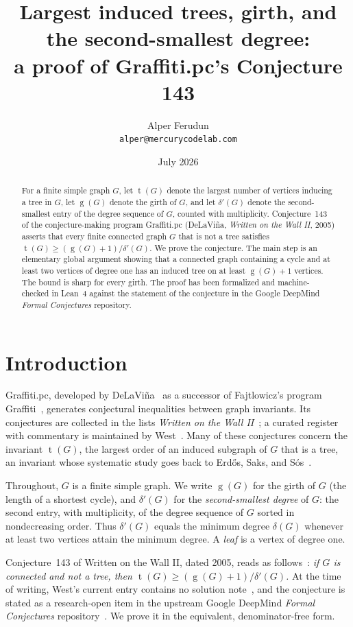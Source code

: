 \documentclass[11pt]{article}
\title{Largest induced trees, girth, and the second-smallest degree:\\
a proof of Graffiti.pc's Conjecture 143}
\author{Alper Ferudun\\\texttt{alper@mercurycodelab.com}}
\date{July 2026}
\numberwithin{equation}{section}
\theoremstyle{remark}
\newcommand{\tr}{\operatorname{t}}
\newcommand{\gr}{\operatorname{g}}
\newcommand{\dd}{\delta'}
\begin{document}
\maketitle

\begin{abstract}
For a finite simple graph $G$, let $\tr(G)$ denote the largest number of
vertices inducing a tree in $G$, let $\gr(G)$ denote the girth of $G$, and let
$\dd(G)$ denote the second-smallest entry of the degree sequence of $G$,
counted with multiplicity.  Conjecture~143 of the conjecture-making program
Graffiti.pc (DeLaVi\~na, \emph{Written on the Wall II}, 2005) asserts that
every finite connected graph $G$ that is not a tree satisfies
$\tr(G)\ge(\gr(G)+1)/\dd(G)$.  We prove the conjecture.  The main step is an
elementary global argument showing that a connected graph containing a cycle
and at least two vertices of degree one has an induced tree on at least
$\gr(G)+1$ vertices.  The bound is sharp for every girth.  The proof has been
formalized and machine-checked in Lean~4 against the statement of the
conjecture in the Google DeepMind \emph{Formal Conjectures} repository.
\end{abstract}

\section{Introduction}

Graffiti.pc, developed by DeLaVi\~na~\cite{DeL01,DeLhistory} as a successor of
Fajtlowicz's program Graffiti~\cite{Faj88}, generates conjectural inequalities
between graph invariants.  Its conjectures are collected in the lists
\emph{Written on the Wall II}~\cite{WOWII}; a curated register with commentary
is maintained by West~\cite{WestReg}.  Many of these conjectures concern the
invariant $\tr(G)$, the largest order of an induced subgraph of $G$ that is a
tree, an invariant whose systematic study goes back to Erd\H{o}s, Saks, and
S\'os~\cite{ESS86}.

Throughout, $G$ is a finite simple graph.  We write $\gr(G)$ for the girth of
$G$ (the length of a shortest cycle), and $\dd(G)$ for the \emph{second-smallest
degree} of $G$: the second entry, with multiplicity, of the degree sequence of
$G$ sorted in nondecreasing order.  Thus $\dd(G)$ equals the minimum degree
$\delta(G)$ whenever at least two vertices attain the minimum degree.  A
\emph{leaf} is a vertex of degree one.

Conjecture~143 of Written on the Wall II, dated 2005, reads as
follows~\cite{WestReg}: \emph{if $G$ is connected and not a tree, then
$\tr(G)\ge(\gr(G)+1)/\dd(G)$.}  At the time of writing, West's current
entry contains no solution note~\cite{WestReg}, and the conjecture is stated
as a research-open item in the upstream Google DeepMind \emph{Formal
Conjectures} repository~\cite{FC,FC143}.  We prove it in the equivalent,
denominator-free form.
\end{document}
